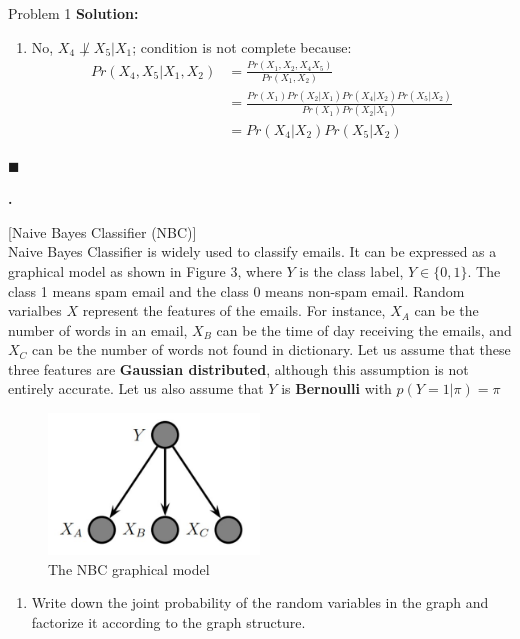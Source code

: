 \documentclass{article}
\newcounter{pcounter}                                   %
\newenvironment{problem}                                %
{                                                       %
    \color{gray}                                        %
    \stepcounter{pcounter}                              %
    \textbf{\arabic{pcounter}.}                         %
}{}                                                     %
\newenvironment{solution}                               %
{\textbf{Solution:} }{$\blacksquare$}                   %
\begin{document}
\begin{section}{Problem 1}
\begin{solution}
\begin{enumerate}[label=(\alph*)]
                \item No, $X_4 \not\perp X_5 | X_1$; condition is not complete because:
                \begin{align*}
                    Pr(X_4, X_5 | X_1, X_2) &= \frac{Pr(X_1, X_2, X_4 X_5)}{Pr(X_1, X_2)} \\
                    &= \frac{Pr(X_1) Pr(X_2|X_1) Pr(X_4|X_2) Pr(X_5|X_2)}{Pr(X_1) Pr(X_2|X_1)} \\
                    &=  Pr(X_4|X_2) Pr(X_5|X_2)
                \end{align*}
            \end{enumerate}
        \end{solution}

        \begin{problem}
            [Naive Bayes Classifier (NBC)]\\
            Naive Bayes Classifier is widely used to classify emails. It can be expressed as a graphical model as shown in Figure 3, where $Y$ is the class label, $Y \in \{0, 1\}$. The class 1 means spam email and the class 0 means non-spam email.
            Random varialbes $X$ represent the features of the emails. For instance, $X_A$ can be the number of words in an email, $X_B$ can be the time of day receiving the emails, and $X_C$ can be the number of words not found in dictionary.
            Let us assume that these three features are \textbf{Gaussian distributed}, although this assumption is not entirely accurate. Let us also assume that $Y$ is \textbf{Bernoulli} with $p(Y=1 | \pi) = \pi$
            \begin{figure}[H]
                \label{fig:m3}
                \centering
                \includegraphics[width=0.5\textwidth]{a2_p12}
                \caption{The NBC graphical model}
            \end{figure}
            \begin{enumerate}[label=(\alph*)]
                \item Write down the joint probability of the random variables in the graph and factorize it according to the graph structure.

\end{enumerate}
\end{problem}
\end{section}
\end{document}

